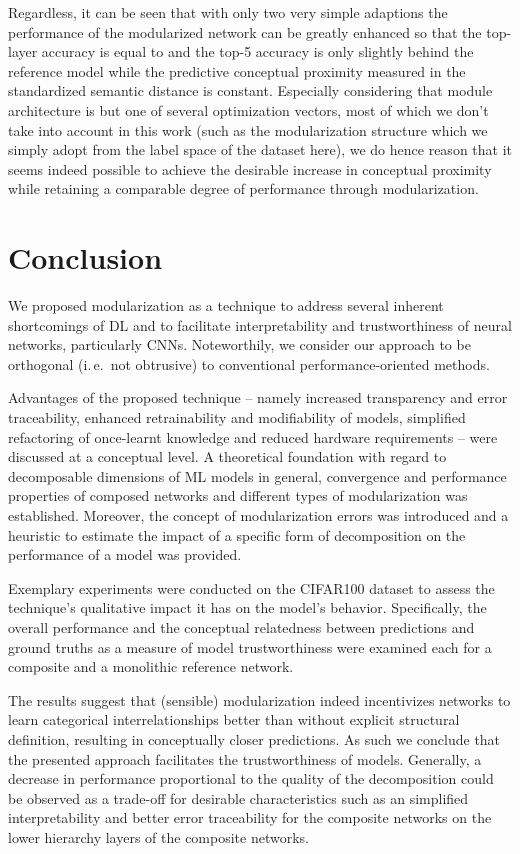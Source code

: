 \documentclass[conference]{IEEEtran}
\begin{document}
Regardless, it can be seen that with only two very simple adaptions the performance of the modularized network can be greatly enhanced so that the top-layer accuracy is equal to and the top-5 accuracy is only slightly behind the reference model while the predictive conceptual proximity measured in the standardized semantic distance is constant. Especially considering that module architecture is but one of several optimization vectors, most of which we don't take into account in this work (such as the modularization structure which we simply adopt from the label space of the dataset here), we do hence reason that it seems indeed possible to achieve the desirable increase in conceptual proximity while retaining a comparable degree of performance through modularization.

\section{Conclusion%
            \label{sec:conclusion}}

We proposed modularization as a technique to address several inherent shortcomings of DL and to facilitate interpretability and trustworthiness of neural networks, particularly CNNs. Noteworthily, we consider our approach to be orthogonal (i.\,e.\ not obtrusive) to conventional performance-oriented methods.

Advantages of the proposed technique -- namely increased transparency and error traceability, enhanced  retrainability  and  modifiability  of  models,  simplified refactoring of once-learnt knowledge and  reduced hardware requirements -- were discussed at a conceptual level. A theoretical foundation with regard to decomposable dimensions of ML models in general, convergence and performance properties of composed networks and different types of modularization was established. Moreover, the concept of modularization errors was introduced and a heuristic to estimate the impact of a specific form of decomposition on the performance of a model was provided.   

Exemplary experiments were conducted on the CIFAR100 dataset to assess the technique's qualitative impact it has on the model's behavior. Specifically, the overall performance and the conceptual relatedness between predictions and ground truths as a measure of model trustworthiness were examined each for a composite and a monolithic reference network.

The results suggest that (sensible) modularization indeed incentivizes networks to learn categorical interrelationships better than without explicit structural definition, resulting in conceptually closer predictions. As such we conclude that the presented approach facilitates the trustworthiness of models. Generally, a decrease in performance proportional to the quality of the decomposition could be observed as a trade-off for desirable characteristics such as an simplified interpretability and better error traceability for the composite networks on the lower hierarchy layers of the composite networks.
\end{document}

